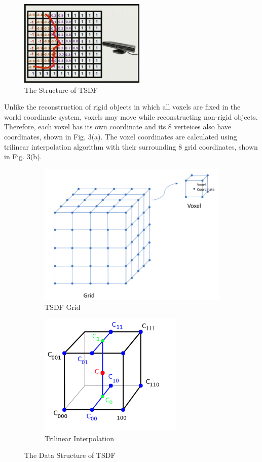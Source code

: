 \documentclass{article}
\begin{document}
\begin{figure}[htp]
\centering
\includegraphics[width=6cm]{figures/tsdf.jpg}
\caption{The Structure of TSDF}
\label{fig:TSDF}
\end{figure}

Unlike the reconstruction of rigid objects in which all voxels are fixed in the world coordinate system, voxels may move while reconstructing non-rigid objects. Therefore, each voxel has its own coordinate and its 8 verteices also have coordinates, shown in Fig. 3(a). The voxel coordinates are calculated using trilinear interpolation algorithm with their surrounding 8 grid coordinates, shown in Fig. 3(b). 

\begin{figure}
\centering
\begin{subfigure}{.65\textwidth}
  \centering
  \includegraphics[width=.65\linewidth]{figures/DataStruct.png}
  \caption{TSDF Grid}
  \label{fig:sub1}
\end{subfigure}%
\begin{subfigure}{.35\textwidth}
  \centering
  \includegraphics[width=.35\linewidth]{figures/3D_interpolation.png}
  \caption{Trilinear Interpolation}
  \label{fig:sub2}
\end{subfigure}
\caption{The Data Structure of TSDF}
\label{fig:test}
\end{figure}
\end{document}
